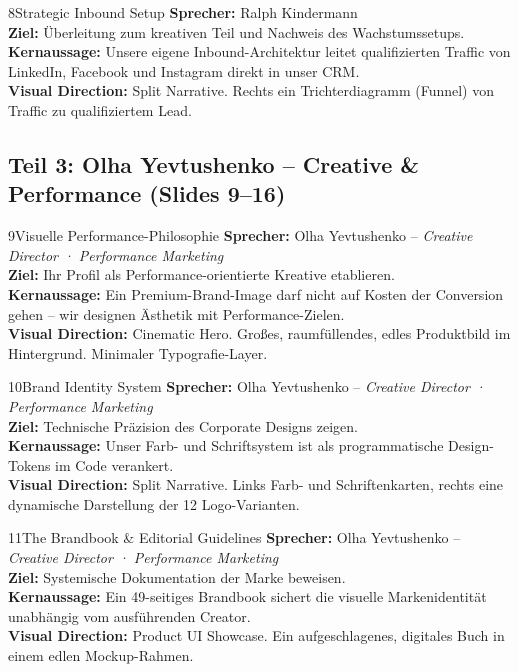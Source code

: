 \documentclass[11pt,a4paper]{article}
\begin{document}
\begin{slidebox}{8}{Strategic Inbound Setup}
    \textbf{Sprecher:} Ralph Kindermann \\
    \textbf{Ziel:} Überleitung zum kreativen Teil und Nachweis des Wachstumssetups.\\
    \textbf{Kernaussage:} Unsere eigene Inbound-Architektur leitet qualifizierten Traffic von LinkedIn, Facebook und Instagram direkt in unser CRM.\\
    \textbf{Visual Direction:} Split Narrative. Rechts ein Trichterdiagramm (Funnel) von Traffic zu qualifiziertem Lead.
\end{slidebox}

\subsection{Teil 3: Olha Yevtushenko -- Creative \& Performance (Slides 9--16)}

\begin{slidebox}{9}{Visuelle Performance-Philosophie}
    \textbf{Sprecher:} Olha Yevtushenko -- \textit{Creative Director · Performance Marketing} \\
    \textbf{Ziel:} Ihr Profil als Performance-orientierte Kreative etablieren.\\
    \textbf{Kernaussage:} Ein Premium-Brand-Image darf nicht auf Kosten der Conversion gehen -- wir designen Ästhetik mit Performance-Zielen.\\
    \textbf{Visual Direction:} Cinematic Hero. Großes, raumfüllendes, edles Produktbild im Hintergrund. Minimaler Typografie-Layer.
\end{slidebox}

\begin{slidebox}{10}{Brand Identity System}
    \textbf{Sprecher:} Olha Yevtushenko -- \textit{Creative Director · Performance Marketing} \\
    \textbf{Ziel:} Technische Präzision des Corporate Designs zeigen.\\
    \textbf{Kernaussage:} Unser Farb- und Schriftsystem ist als programmatische Design-Tokens im Code verankert.\\
    \textbf{Visual Direction:} Split Narrative. Links Farb- und Schriftenkarten, rechts eine dynamische Darstellung der 12 Logo-Varianten.
\end{slidebox}

\begin{slidebox}{11}{The Brandbook & Editorial Guidelines}
    \textbf{Sprecher:} Olha Yevtushenko -- \textit{Creative Director · Performance Marketing} \\
    \textbf{Ziel:} Systemische Dokumentation der Marke beweisen.\\
    \textbf{Kernaussage:} Ein 49-seitiges Brandbook sichert die visuelle Markenidentität unabhängig vom ausführenden Creator.\\
    \textbf{Visual Direction:} Product UI Showcase. Ein aufgeschlagenes, digitales Buch in einem edlen Mockup-Rahmen.
\end{slidebox}
\end{document}
